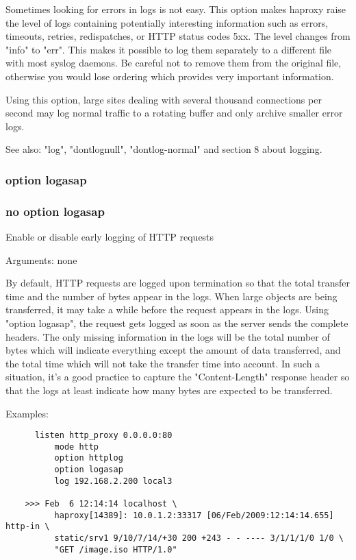   Sometimes looking for errors in logs is not easy. This option makes haproxy
  raise the level of logs containing potentially interesting information such
  as errors, timeouts, retries, redispatches, or HTTP status codes 5xx. The
  level changes from "info" to "err". This makes it possible to log them
  separately to a different file with most syslog daemons. Be careful not to
  remove them from the original file, otherwise you would lose ordering which
  provides very important information.

  Using this option, large sites dealing with several thousand connections per
  second may log normal traffic to a rotating buffer and only archive smaller
  error logs.

  See also: "log", "dontlognull", "dontlog-normal" and section 8 about
             logging.

\subsubsection{option logasap}
\subsubsection{no option logasap}


  Enable or disable early logging of HTTP requests


  Arguments: none

  By default, HTTP requests are logged upon termination so that the total
  transfer time and the number of bytes appear in the logs. When large objects
  are being transferred, it may take a while before the request appears in the
  logs. Using "option logasap", the request gets logged as soon as the server
  sends the complete headers. The only missing information in the logs will be
  the total number of bytes which will indicate everything except the amount
  of data transferred, and the total time which will not take the transfer
  time into account. In such a situation, it's a good practice to capture the
  "Content-Length" response header so that the logs at least indicate how many
  bytes are expected to be transferred.

  Examples:
\begin{verbatim}
      listen http_proxy 0.0.0.0:80
          mode http
          option httplog
          option logasap
          log 192.168.2.200 local3

    >>> Feb  6 12:14:14 localhost \
          haproxy[14389]: 10.0.1.2:33317 [06/Feb/2009:12:14:14.655] http-in \
          static/srv1 9/10/7/14/+30 200 +243 - - ---- 3/1/1/1/0 1/0 \
          "GET /image.iso HTTP/1.0"
\end{verbatim}

